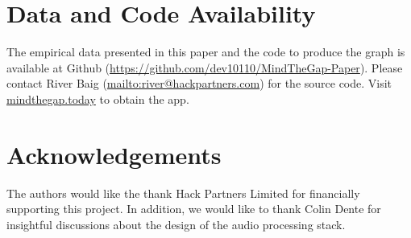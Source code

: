 \documentclass{article}
\begin{document}
\section*{Data and Code Availability}

The empirical data presented in this paper and the code to produce the graph is available at Github (\url{https://github.com/dev10110/MindTheGap-Paper}). Please contact River Baig (\url{mailto:river@hackpartners.com}) for the source code. Visit \url{mindthegap.today} to obtain the app. 

\section*{Acknowledgements}

The authors would like the thank Hack Partners Limited for financially supporting this project. In addition, we would like to thank Colin Dente for insightful discussions about the design of the audio processing stack.


  
\end{document}
